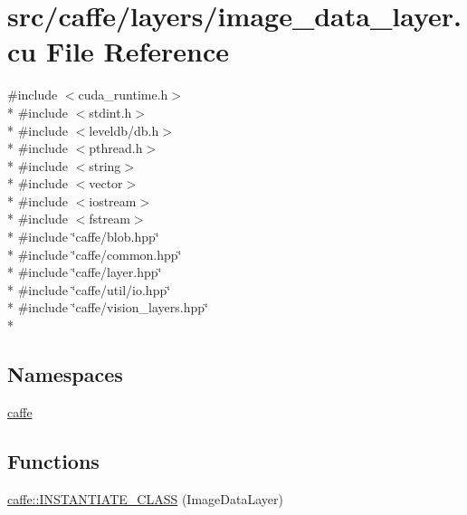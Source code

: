 \hypertarget{image__data__layer_8cu}{\section{src/caffe/layers/image\+\_\+data\+\_\+layer.cu File Reference}
\label{image__data__layer_8cu}
}
{\ttfamily \#include $<$cuda\+\_\+runtime.\+h$>$}\\*
{\ttfamily \#include $<$stdint.\+h$>$}\\*
{\ttfamily \#include $<$leveldb/db.\+h$>$}\\*
{\ttfamily \#include $<$pthread.\+h$>$}\\*
{\ttfamily \#include $<$string$>$}\\*
{\ttfamily \#include $<$vector$>$}\\*
{\ttfamily \#include $<$iostream$>$}\\*
{\ttfamily \#include $<$fstream$>$}\\*
{\ttfamily \#include \char`\"{}caffe/blob.\+hpp\char`\"{}}\\*
{\ttfamily \#include \char`\"{}caffe/common.\+hpp\char`\"{}}\\*
{\ttfamily \#include \char`\"{}caffe/layer.\+hpp\char`\"{}}\\*
{\ttfamily \#include \char`\"{}caffe/util/io.\+hpp\char`\"{}}\\*
{\ttfamily \#include \char`\"{}caffe/vision\+\_\+layers.\+hpp\char`\"{}}\\*
\subsection*{Namespaces}
\begin{DoxyCompactItemize}
\item 
 \hyperlink{namespacecaffe}{caffe}
\end{DoxyCompactItemize}
\subsection*{Functions}
\begin{DoxyCompactItemize}
\item 
\hyperlink{namespacecaffe_a5d45d14c45e75d872ff0675cd9dbcec1}{caffe\+::\+I\+N\+S\+T\+A\+N\+T\+I\+A\+T\+E\+\_\+\+C\+L\+A\+S\+S} (Image\+Data\+Layer)
\end{DoxyCompactItemize}
